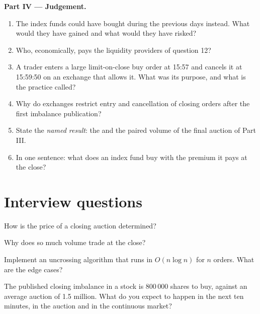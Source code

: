 \begin{problem}
\medskip\noindent\textbf{Part IV --- Judgement.}
\begin{enumerate}[resume]
\item The index funds could have bought during the previous days instead.
What would they have gained and what would they have risked?
\item Who, economically, pays the liquidity providers of question 12?
\item A trader enters a large limit-on-close buy order at 15:57 and cancels
it at 15:59:50 on an exchange that allows it. What was its purpose, and what
is the practice called?
\item Why do exchanges restrict entry and cancellation of closing orders
after the first imbalance publication?
\item State the \emph{named result}: the  and the paired
volume of the final auction of Part III.
\item In one sentence: what does an index fund buy with the premium it pays
at the close?
\end{enumerate}
\end{problem}

\section{Interview questions}

\begin{interviewq}\label{iq:m1:auctions:1}
How is the price of a closing auction determined?
\end{interviewq}

\begin{interviewq}\label{iq:m1:auctions:2}
Why does so much volume trade at the close?
\end{interviewq}

\begin{interviewq}\label{iq:m1:auctions:3}
Implement an uncrossing algorithm that runs in $O(n \log n)$ for $n$ orders.
What are the edge cases?
\end{interviewq}

\begin{interviewq}\label{iq:m1:auctions:4}
The published closing imbalance in a stock is 800\,000 shares to buy, against
an average auction of 1.5 million. What do you expect to happen in the next
ten minutes, in the auction and in the continuous market?
\end{interviewq}

